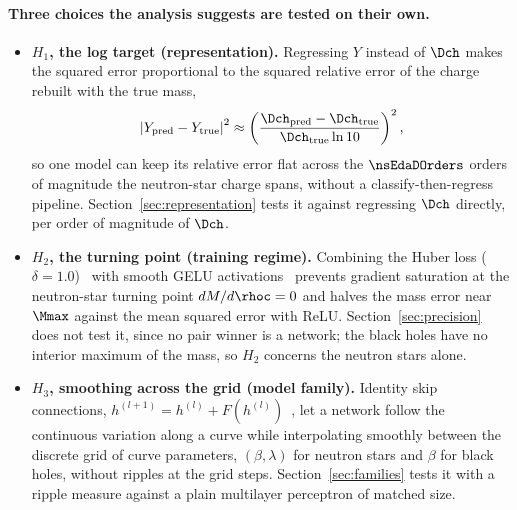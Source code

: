 \paragraph{Three choices the analysis suggests are tested on their own.}
\begin{itemize}
  \item \textbf{$H_1$, the log target (representation).} Regressing $Y$ instead of $\Dch$ makes the squared error proportional to the squared relative error of the charge rebuilt with the true mass,
  \[
    \left| Y_{\mathrm{pred}} - Y_{\mathrm{true}} \right|^2 \approx \left( \frac{\Dch_{\mathrm{pred}} - \Dch_{\mathrm{true}}}{\Dch_{\mathrm{true}} \ln 10} \right)^2 ,
  \]
  so one model can keep its relative error flat across the $\nsEdaDOrders$ orders of magnitude the neutron-star charge spans, without a classify-then-regress pipeline. Section~\ref{sec:representation} tests it against regressing $\Dch$ directly, per order of magnitude of $\Dch$.
  \item \textbf{$H_2$, the turning point (training regime).} Combining the Huber loss ($\delta = 1.0$)~\citep{Huber1964} with smooth GELU activations~\citep{Hendrycks2016_GELU} prevents gradient saturation at the neutron-star turning point $dM/d\rhoc = 0$ and halves the mass error near $\Mmax$ against the mean squared error with ReLU. Section~\ref{sec:precision} does not test it, since no pair winner is a network; the black holes have no interior maximum of the mass, so $H_2$ concerns the neutron stars alone.
  \item \textbf{$H_3$, smoothing across the grid (model family).} Identity skip connections, $h^{(l+1)} = h^{(l)} + F(h^{(l)})$~\citep{He2016_ResNet}, let a network follow the continuous variation along a curve while interpolating smoothly between the discrete grid of curve parameters, $(\beta, \lambda)$ for neutron stars and $\beta$ for black holes, without ripples at the grid steps. Section~\ref{sec:families} tests it with a ripple measure against a plain multilayer perceptron of matched size.
\end{itemize}
